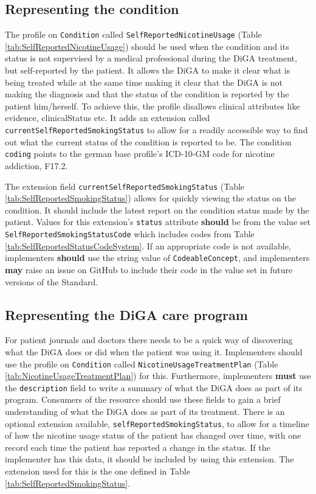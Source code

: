 \documentclass[12px]{report}
\def\code#1{\texttt{#1}} %
\newcommand{\tabcondition}{}
\newcommand{\tabplan}{}
\newcommand{\tabstatusext}{}
\newcommand{\tabstatuscs}{}
\begin{document}
\subsection{Representing the condition}
\tabcondition

The profile on \code{Condition} called \code{SelfReportedNicotineUsage} (Table \ref{tab:SelfReportedNicotineUsage}) should be used when the condition and its status is not supervised by a medical professional during the DiGA treatment, but self-reported by the patient.
It allows the DiGA to make it clear what is being treated while at the same time making it clear that the DiGA is not making the diagnosis and that the status of the condition is reported by the patient him/herself. 
To achieve this, the profile disallows clinical attributes like evidence, clinicalStatus etc. It adds an extension called \code{currentSelfReportedSmokingStatus} to allow for a readily accessible way to find out what the current status of the condition is reported to be.
The condition \code{coding} points to the german base profile's \cite{debasis} ICD-10-GM code \cite{icd} for nicotine addiction, F17.2.

\tabstatuscs
\tabstatusext

The extension field \code{currentSelfReportedSmokingStatus} (Table \ref{tab:SelfReportedSmokingStatus}) allows for quickly viewing the status on the condition. It should include the latest report on the condition status made by the patient.
Values for this extension's \code{status} attribute \textbf{should} be from the value set \code{SelfReportedSmokingStatusCode} which includes codes from Table \ref{tab:SelfReportedStatusCodeSystem}. If an appropriate code is not available, implementers \textbf{should} use the string value of \code{CodeableConcept}, 
and implementers \textbf{may} raise an issue on GitHub \cite{github} to include their code in the value set in future versions of the Standard.

\subsection{Representing the DiGA care program}
\tabplan
For patient journals and doctors there needs to be a quick way of discovering what the DiGA does or did when the patient was using it. 
Implementers should use the profile on \code{Condition} called \code{NicotineUsageTreatmentPlan} (Table \ref{tab:NicotineUsageTreatmentPlan}) for this. 
Furthermore, implementers \textbf{must} use the \code{description} field to write a summary of what the DiGA does as part of its program.
Consumers of the resource should use these fields to gain a brief understanding of what the DiGA does as part of its treatment.
There is an optional extension available, \code{selfReportedSmokingStatus}, to allow for a timeline of how the nicotine usage status of the patient has changed over time, with one record each time the patient has reported a change in the status. 
If the implementer has this data, it should be included by using this extension. The extension used for this is the one defined in Table \ref{tab:SelfReportedSmokingStatus}.
\end{document}
